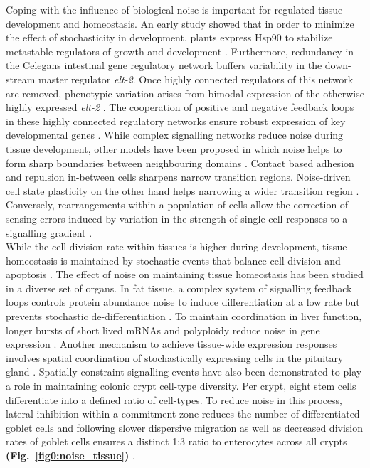 Coping with the influence of biological noise is important for regulated tissue development and homeostasis. An early study showed that in order to minimize the effect of stochasticity in development, plants express \gls{Hsp90} to stabilize metastable regulators of growth and development \citep{Queitsch2002}. Furthermore, redundancy in the \Gls{Celegans} intestinal gene regulatory network buffers variability in the down-stream master regulator \textit{elt-2}. Once highly connected regulators of this network are removed, phenotypic variation arises from bimodal expression of the otherwise highly expressed \textit{elt-2} \citep{Raj2010}. The cooperation of positive and negative feedback loops in these highly connected regulatory networks ensure robust expression of key developmental genes \citep{Ji2013}. While complex signalling networks reduce noise during tissue development, other models have been proposed in which noise helps to form sharp boundaries between neighbouring domains \citep{Zhang2012}. Contact based adhesion and repulsion in-between cells sharpens narrow transition regions. Noise-driven cell state plasticity on the other hand helps narrowing a wider transition region \citep{Wang2017}. Conversely, rearrangements within a population of cells allow the correction of sensing errors induced by variation in the strength of single cell responses to a signalling gradient \citep{Camley2017}.\\

While the cell division rate within tissues is higher during development, tissue homeostasis is maintained by stochastic events that balance cell division and apoptosis \citep{Ranft2010}. The effect of noise on maintaining tissue homeostasis has been studied in a diverse set of organs. In fat tissue, a complex system of signalling feedback loops controls protein abundance noise to induce differentiation at a low rate but prevents stochastic de-differentiation \citep{Ahrends2014}. To maintain coordination in liver function, longer bursts of short lived mRNAs and polyploidy reduce noise in gene expression \citep{BaharHalpern2015}. Another mechanism to achieve tissue-wide expression responses involves spatial coordination of stochastically expressing cells in the pituitary gland \citep{Featherstone2016}. Spatially constraint signalling events have also been demonstrated to play a role in maintaining colonic crypt cell-type diversity. Per crypt, eight stem cells differentiate into a defined ratio of cell-types. To reduce noise in this process, lateral inhibition within a commitment zone reduces the number of differentiated goblet cells and following slower dispersive migration as well as decreased division rates of goblet cells ensures a distinct 1:3 ratio to enterocytes across all crypts \textbf{(Fig.~\ref{fig0:noise_tissue})} \citep{Toth2017}.

